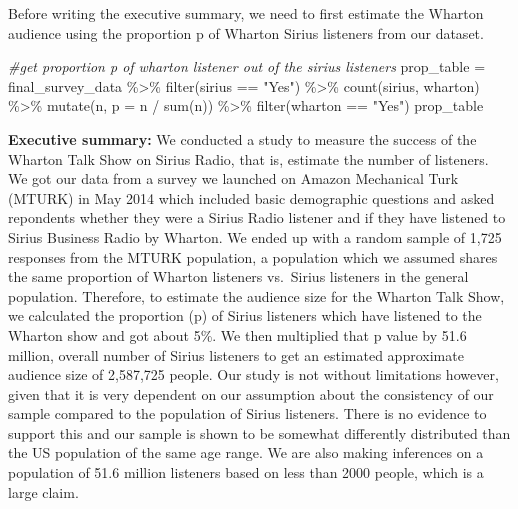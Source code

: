 \documentclass[
]{article}
\newenvironment{Shaded}{\begin{snugshade}}{\end{snugshade}}
\newcommand{\AttributeTok}[1]{\textcolor[rgb]{0.77,0.63,0.00}{#1}}
\newcommand{\CommentTok}[1]{\textcolor[rgb]{0.56,0.35,0.01}{\textit{#1}}}
\newcommand{\DecValTok}[1]{\textcolor[rgb]{0.00,0.00,0.81}{#1}}
\newcommand{\FunctionTok}[1]{\textcolor[rgb]{0.00,0.00,0.00}{#1}}
\newcommand{\NormalTok}[1]{#1}
\newcommand{\OtherTok}[1]{\textcolor[rgb]{0.56,0.35,0.01}{#1}}
\newcommand{\SpecialCharTok}[1]{\textcolor[rgb]{0.00,0.00,0.00}{#1}}
\newcommand{\StringTok}[1]{\textcolor[rgb]{0.31,0.60,0.02}{#1}}
\begin{document}
Before writing the executive summary, we need to first estimate the
Wharton audience using the proportion p of Wharton Sirius listeners from
our dataset.

\begin{Shaded}
\begin{Highlighting}[]
\CommentTok{\#get proportion p of wharton listener out of the sirius listeners}
\NormalTok{prop\_table }\OtherTok{=}\NormalTok{ final\_survey\_data }\SpecialCharTok{\%\textgreater{}\%} \FunctionTok{filter}\NormalTok{(sirius }\SpecialCharTok{==} \StringTok{"Yes"}\NormalTok{) }\SpecialCharTok{\%\textgreater{}\%} \FunctionTok{count}\NormalTok{(sirius, wharton) }\SpecialCharTok{\%\textgreater{}\%} \FunctionTok{mutate}\NormalTok{(n, }\AttributeTok{p =}\NormalTok{ n }\SpecialCharTok{/} \FunctionTok{sum}\NormalTok{(n)) }\SpecialCharTok{\%\textgreater{}\%} \FunctionTok{filter}\NormalTok{(wharton }\SpecialCharTok{==} \StringTok{"Yes"}\NormalTok{)}
\NormalTok{prop\_table}
\end{Highlighting}
\end{Shaded}

\begin{Shaded}
\end{Shaded}

\textbf{Executive summary:} We conducted a study to measure the success
of the Wharton Talk Show on Sirius Radio, that is, estimate the number
of listeners. We got our data from a survey we launched on Amazon
Mechanical Turk (MTURK) in May 2014 which included basic demographic
questions and asked repondents whether they were a Sirius Radio listener
and if they have listened to Sirius Business Radio by Wharton. We ended
up with a random sample of 1,725 responses from the MTURK population, a
population which we assumed shares the same proportion of Wharton
listeners vs.~Sirius listeners in the general population. Therefore, to
estimate the audience size for the Wharton Talk Show, we calculated the
proportion (p) of Sirius listeners which have listened to the Wharton
show and got about 5\%. We then multiplied that p value by 51.6 million,
overall number of Sirius listeners to get an estimated approximate
audience size of 2,587,725 people. Our study is not without limitations
however, given that it is very dependent on our assumption about the
consistency of our sample compared to the population of Sirius
listeners. There is no evidence to support this and our sample is shown
to be somewhat differently distributed than the US population of the
same age range. We are also making inferences on a population of 51.6
million listeners based on less than 2000 people, which is a large
claim.
\end{document}
